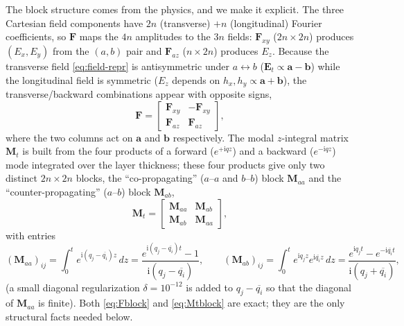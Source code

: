 \documentclass[11pt]{article}
\theoremstyle{remark}
\newcommand{\fa}{\mathbf{a}}
\newcommand{\fb}{\mathbf{b}}
\newcommand{\ii}{\mathrm{i}}
\begin{document}
The block structure comes from the physics, and we make it explicit.  The
three Cartesian field components have $2n$ (transverse) $+n$ (longitudinal)
Fourier coefficients, so $\mathbf{F}$ maps the $4n$ amplitudes to the $3n$
fields: $\mathbf{F}_{xy}$ ($2n\times2n$) produces $(E_x,E_y)$ from the
$(a,b)$ pair and $\mathbf{F}_{az}$ ($n\times2n$) produces $E_z$.  Because the
transverse field \eqref{eq:field-repr} is antisymmetric under
$a\leftrightarrow b$ ($\mathbf{E}_t\propto\fa-\fb$) while the longitudinal
field is symmetric ($E_z$ depends on $h_x,h_y\propto\fa+\fb$), the
transverse/backward combinations appear with opposite signs,
\begin{equation}
\mathbf{F}=
\begin{bmatrix}\mathbf{F}_{xy} & -\mathbf{F}_{xy}\\
\mathbf{F}_{az} & \mathbf{F}_{az}\end{bmatrix},
\label{eq:Fblock}
\end{equation}
where the two columns act on $\fa$ and $\fb$ respectively.  The modal
$z$-integral matrix $\mathbf{M}_t$ is built from the four products of a
forward ($e^{+\ii q z}$) and a backward ($e^{-\ii q z}$) mode integrated over
the layer thickness; these four products give only two distinct $2n\times2n$
blocks, the ``co-propagating'' ($a$--$a$ and $b$--$b$) block $\mathbf{M}_{aa}$
and the ``counter-propagating'' ($a$--$b$) block $\mathbf{M}_{ab}$,
\begin{equation}
\mathbf{M}_t=
\begin{bmatrix}\mathbf{M}_{aa}&\mathbf{M}_{ab}\\
\mathbf{M}_{ab}&\mathbf{M}_{aa}\end{bmatrix},
\label{eq:Mtblock}
\end{equation}
with entries
\begin{equation}
(\mathbf{M}_{aa})_{ij}
=\int_0^{t}e^{\ii(q_j-\overline{q_i})z}\,dz
=\frac{e^{\ii(q_j-\overline{q_i})t}-1}{\ii(q_j-\overline{q_i})},\qquad
(\mathbf{M}_{ab})_{ij}
=\int_0^{t}e^{\ii q_j z}e^{\ii\overline{q_i}z}\,dz
=\frac{e^{\ii q_j t}-e^{-\ii\overline{q_i}t}}{\ii(q_j+\overline{q_i})},
\label{eq:Mzint}
\end{equation}
(a small diagonal regularization $\delta=10^{-12}$ is added to
$q_j-\overline{q_i}$ so that the diagonal of $\mathbf{M}_{aa}$ is finite).
Both \eqref{eq:Fblock} and \eqref{eq:Mtblock} are exact; they are the only
structural facts needed below.
\end{document}
